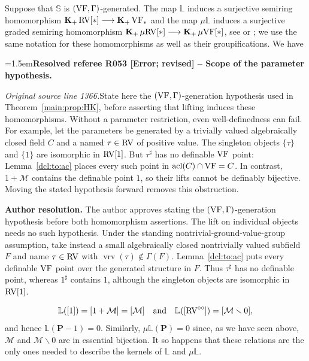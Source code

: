 \documentclass[12pt]{amsart}
\newcommand{\ResolvedRefereeRemark}[5]{%
  \par\medskip\begingroup\normalfont\small\color{gray}%
  \emergencystretch=1.5em\noindent\textbf{Resolved referee R#1 [#2] -- #3.}\par\nobreak\noindent #4\par
  \medskip\color{ResolutionGreen}\noindent\textbf{Author resolution.} #5\par
  \endgroup\medskip
}
\theoremstyle{plain}
\theoremstyle{definition}
\theoremstyle{remark}
\numberwithin{equation}{section}
\theoremstyle{plain}
\newcommand{\VF}{\textup{VF}}
\newcommand{\RV}{\textup{RV}}
\newcommand{\MM}{\mdl M}
\DeclareMathOperator{\acl}{acl}
\newcommand{\dand}{\quad \text{and} \quad}
\newcommand{\0}{\emptyset}
\newcommand{\mdl}[1]{\mathcal{#1}}  %
\newcommand{\bb}[1]{\mathbb{#1}}
\newcommand{\fun}{\longrightarrow}
\newcommand{\mi}{\smallsetminus}
\newcommand{\mgVF}{{\mu} {\VF}}
\newcommand{\mgRV}{{\mu}{\RV}}
\newcommand{\mgL}{{\mu}{\bb L}}
\DeclareMathOperator{\gsk}{\mathbf{K}_+}
\DeclareMathOperator{\vrv}{vrv}
\begin{document}
Suppose that $\mathbb S$ is $(\VF,\Gamma)$-generated. The map $\bb L$ induces a surjective semiring homomorphism $\gsk \RV[*] \fun \gsk \VF_*$ and the map $\mgL$ induces a surjective graded semiring homomorphism $\gsk \mgRV[*] \fun \gsk \mgVF[*]$, see \cite[\S~4, \S~6]{hrushovski:kazhdan:integration:vf} or \cite[Corollaries~7.7, 10.6]{Yin:special:trans}; we use the same notation for these homomorphisms as well as their groupifications. We have

\ResolvedRefereeRemark{053}{Error; revised}{Scope of the parameter hypothesis}{%
\textit{Original source line 1366.}\quad State here the $(\VF,\Gamma)$-generation hypothesis used in Theorem~\ref{main:prop:HK}, before asserting that lifting induces these homomorphisms. Without a parameter restriction, even well-definedness can fail. For example, let the parameters be generated by a trivially valued algebraically closed field $C$ and a named $\tau\in\RV$ of positive value. The singleton objects $\{\tau\}$ and $\{1\}$ are isomorphic in $\RV[1]$. But $\tau^\sharp$ has no definable $\VF$ point: Lemma~\ref{dcl:to:ac} places every such point in $\acl(C)\cap\VF=C$. In contrast, $1+\MM$ contains the definable point $1$, so their lifts cannot be definably bijective. Moving the stated hypothesis forward removes this obstruction.
}{The author approves stating the $(\VF,\Gamma)$-generation hypothesis before both homomorphism assertions. The lift on individual objects needs no such hypothesis. Under the standing nontrivial-ground-value-group assumption, take instead a small algebraically closed nontrivially valued subfield $F$ and name $\tau\in\RV$ with $\vrv(\tau)\notin\Gamma(F)$. Lemma~\ref{dcl:to:ac} puts every definable $\VF$ point over the generated structure in $F$. Thus $\tau^\sharp$ has no definable point, whereas $1^\sharp$ contains $1$, although the singleton objects are isomorphic in $\RV[1]$.}
\[
\bb L ([1]) = [1 + \MM] = [\MM] \dand \bb L ([\RV^{\circ\circ}])=[\MM \mi 0],
\]
and hence $\bb L (\bm P - 1)=0$. Similarly, $\mgL (\bm P)=0$ since, as we have seen above, $\MM$ and $\MM \mi 0$ are in essential bijection. It so happens that these relations are the only ones needed to describe the kernels of $\bb L$ and $\mgL$.
\end{document}
